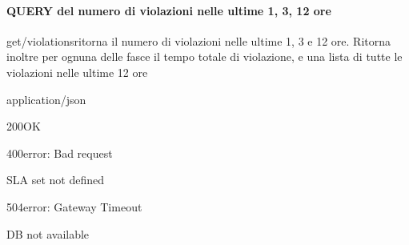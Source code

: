\paragraph{QUERY del numero di violazioni nelle ultime 1, 3, 12 ore}
    \begin{apiRoute}{get}{/violations}{ritorna il numero di violazioni nelle ultime 1, 3 e 12 ore. Ritorna inoltre per ognuna delle fasce il tempo totale di violazione, e una lista di tutte le violazioni nelle ultime 12 ore}
    	\begin{routeResponse}{application/json}
    		\begin{routeResponseItem}{200}{OK}
    			\begin{routeResponseItemBody}
    			\end{routeResponseItemBody}
    		\end{routeResponseItem}
                \begin{routeResponseItem}{400}{error: Bad request}
    			\begin{routeResponseItemBody}
SLA set not defined
    			\end{routeResponseItemBody}
    		\end{routeResponseItem}
    		\begin{routeResponseItem}{504}{error: Gateway Timeout}
    			\begin{routeResponseItemBody}
DB not available
    			\end{routeResponseItemBody}
    		\end{routeResponseItem}
    	\end{routeResponse}
    	
    \end{apiRoute}

